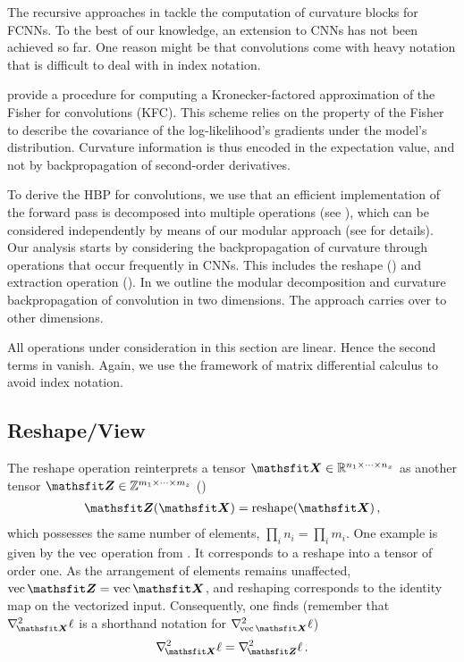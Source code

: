 The recursive approaches in \cite{botev2017practical,wei2018bdapch} tackle the
computation of curvature blocks for FCNNs. To the best of our knowledge, an
extension to CNNs has not been achieved so far. One reason might be that
convolutions come with heavy notation that is difficult to deal with in index
notation.

\citet{martens2015optimizing} provide a procedure for computing a Kronecker-factored
approximation of the Fisher for convolutions (KFC). This scheme relies on the
property of the Fisher to describe the covariance of the log-likelihood's
gradients under the model's distribution. Curvature information is thus encoded
in the expectation value, and not by backpropagation of second-order
derivatives.

To derive the HBP for convolutions, we use that an efficient implementation of
the forward pass is decomposed into multiple operations (see
), which can be considered independently
by means of our modular approach (see  for
details). Our analysis starts by considering the backpropagation of curvature
through operations that occur frequently in CNNs. This includes the reshape
() and extraction operation
(). In  we
outline the modular decomposition and curvature backpropagation of convolution
in two dimensions. The approach carries over to other dimensions.

All operations under consideration in this section are linear. Hence the second
terms in  vanish. Again, we use the
framework of matrix differential calculus
\citep{magnus1999MatrixDifferentialCalculus} to avoid index notation.

\subsection{Reshape/View}\label{hbp::subsec:HBPReshape}
The reshape operation reinterprets a tensor $\tX \in \mathbb{R}^{n_1 \times
  \dots \times n_x}$ as another tensor $\tZ\in \mathbb{Z}^{m_1 \times \dots
  \times m_z}$ ()
\begin{align*}
  \tZ(\tX) = \mathrm{reshape}(\tX)\,,
\end{align*}
which possesses the same number of elements, \ie $\prod_i n_i = \prod_i m_i$.
One example is given by the $\vec$ operation from
. It corresponds to a reshape into a tensor of
order one. As the arrangement of elements remains unaffected, $\vec \tZ = \vec
\tX$, and reshaping corresponds to the identity map on the vectorized input.
Consequently, one finds (remember that $\gradsquared{\tX}\ell$ is a shorthand
notation for $\gradsquared{\vec \tX}\ell$)
\begin{align*}
  \gradsquared{\tX}\ell = \gradsquared{\tZ}\ell \,.
\end{align*}

